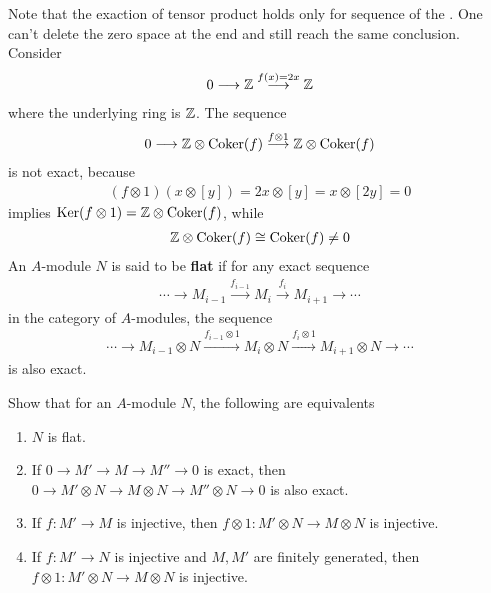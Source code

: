 \documentclass{report}
\begin{document}
\begin{mdframed}
Note that the exaction of tensor product holds only for sequence of the . One can't delete the zero space at the end and still reach the same conclusion. Consider 
\begin{align*}
0\longrightarrow \mathbb{Z} \overset{f(x)=2x}{\longrightarrow }\mathbb{Z} 
\end{align*}
where the underlying ring is $\mathbb{Z}$. The sequence 
\begin{align*}
0\longrightarrow \mathbb{Z} \otimes \operatorname{Coker}(f) \overset{f\otimes  1}{\longrightarrow } \mathbb{Z} \otimes  \operatorname{Coker}(f)
\end{align*}
is not exact, because 
\begin{align*}
  (f\otimes 1)(x \otimes  [y])=2x \otimes  [y]= x \otimes  [2y]= 0 
\end{align*}
implies $\operatorname{Ker}(f\otimes  1)=\mathbb{Z} \otimes  \operatorname{Coker}(f)$, while 
\begin{align*}
\mathbb{Z} \otimes  \operatorname{Coker}(f)\cong  \operatorname{Coker}(f)\neq 0 
\end{align*}
An $A$-module $N$ is said to be \textbf{flat} if for any exact sequence 
\begin{align*}
\cdots \rightarrow M_{i-1} \overset{f_{i-1}}{\longrightarrow } M_i \overset{f_i}{\longrightarrow }M_{i+1}\rightarrow \cdots
\end{align*}
in the category of $A$-modules, the sequence 
 \begin{align*}
\cdots \rightarrow M_{i-1}\otimes  N \overset{f_{i-1}\otimes  1}{\longrightarrow }M_i \otimes  N \overset{f_i \otimes 1 }{\longrightarrow }M_{i+1}\otimes  N \rightarrow \cdots 
\end{align*}
is also exact. 
\end{mdframed}
\begin{question}{}{}
Show that for an $A$-module  $N$, the following are equivalents 
\begin{enumerate}[label=(\alph*)]
  \item $N$ is flat. 
  \item If $0\rightarrow M'\longrightarrow M\longrightarrow M''\rightarrow  0$ is exact, then $0\rightarrow  M'\otimes N \longrightarrow M\otimes N \longrightarrow M''\otimes N \rightarrow 0$ is also exact. 
  \item If $f:M'\rightarrow M$ is injective, then $f\otimes  1:M'\otimes  N \rightarrow M\otimes N$ is injective. 
  \item If $f:M'\rightarrow N$ is injective and $M,M'$ are finitely generated, then  $f\otimes 1:M'\otimes N\rightarrow M\otimes N$ is injective. 
\end{enumerate}
\end{question}
\end{document}
